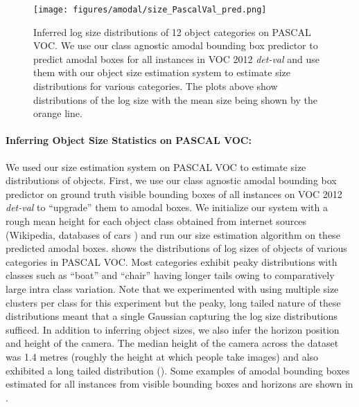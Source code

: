 \begin{figure}[htb]
  \centering
  \texttt{[image: figures/amodal/size\_PascalVal\_pred.png]}
  \caption{ Inferred log size distributions of 12 object categories on PASCAL VOC. We use our class agnostic amodal bounding box predictor to predict amodal boxes for all instances in VOC 2012 \textit{det-val} and use them with our object size estimation system to estimate size distributions for various categories. The plots above show distributions of the log size with the mean size being shown by the orange line.}
\end{figure}

\paragraph{Inferring Object Size Statistics on PASCAL VOC:} We used our size estimation system on PASCAL VOC to estimate size distributions of objects. First, we use our class agnostic amodal bounding box predictor on ground truth visible bounding boxes of all instances on VOC 2012 \textit{det-val} to ``upgrade'' them to amodal boxes. We initialize our system with a rough mean height for each object class obtained from internet sources (Wikipedia, databases of cars \etc) and run our size estimation algorithm on these predicted amodal boxes.  shows the distributions of log sizes of objects of various categories in PASCAL VOC. Most categories exhibit peaky distributions with classes such as ``boat'' and ``chair'' having longer tails owing to comparatively large intra class variation. Note that we experimented with using multiple size clusters per class for this experiment but the peaky, long tailed nature of these distributions meant that a single Gaussian capturing the log size distributions sufficed. In addition to inferring object sizes, we also infer the horizon position and height of the camera. The median height of the camera across the dataset was 1.4 metres (roughly the height at which people take images) and also exhibited a long tailed distribution (). Some examples of amodal bounding boxes estimated for all instances from visible bounding boxes and horizons are shown in .


